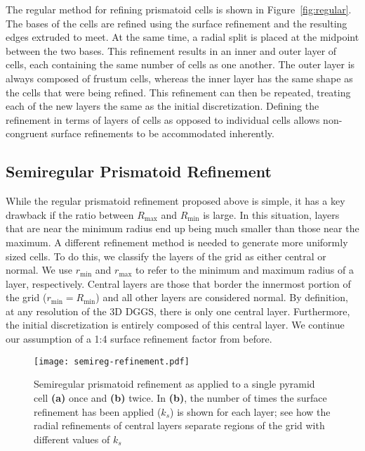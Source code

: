 The regular method for refining prismatoid cells is shown in Figure~\ref{fig:regular}.
The bases of the cells are refined using the surface refinement and the resulting edges extruded to meet.
At the same time, a radial split is placed at the midpoint between the two bases.
This refinement results in an inner and outer layer of cells, each containing the same number of cells as one another.
The outer layer is always composed of frustum cells, whereas the inner layer has the same shape as the cells that were being refined.
This refinement can then be repeated, treating each of the new layers the same as the initial discretization.
Defining the refinement in terms of layers of cells as opposed to individual cells allows non-congruent surface refinements to be accommodated inherently.


\subsection{Semiregular Prismatoid Refinement} \label{sec:grid:degen}
While the regular prismatoid refinement proposed above is simple, it has a key drawback if the ratio between $R_\mathrm{max}$ and $R_\mathrm{min}$ is large.
In this situation, layers that are near the minimum radius end up being much smaller than those near the maximum.
A different refinement method is needed to generate more uniformly sized cells.
To do this, we classify the layers of the grid as either central or normal.
We use $r_\mathrm{min}$ and $r_\mathrm{max}$ to refer to the minimum and maximum radius of a layer, respectively.
Central layers are those that border the innermost portion of the grid ($r_\mathrm{min} = R_\mathrm{min}$) and all other layers are considered normal.
By definition, at any resolution of the 3D DGGS, there is only one central layer.
Furthermore, the initial discretization is entirely composed of this central layer.
We continue our assumption of a 1:4 surface refinement factor from before.


\begin{figure}[h]
	\centering
	\texttt{[image: semireg-refinement.pdf]}
	\caption{Semiregular prismatoid refinement as applied to a single pyramid cell \textbf{(a)} once and \textbf{(b)} twice.
		In \textbf{(b)}, the number of times the surface refinement has been applied ($k_s$) is shown for each layer; see how the radial refinements of central layers separate regions of the grid with different values of $k_s$}
	\label{fig:semiregular}
\end{figure}



